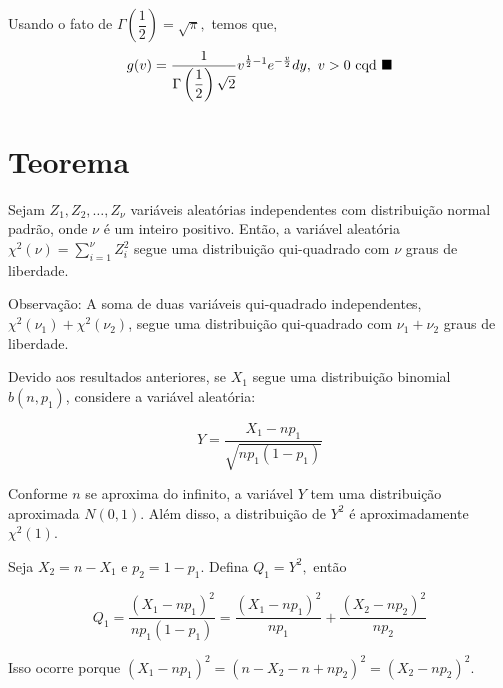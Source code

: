 \documentclass[12pt]{beamer}
\begin{document}
\begin{frame}{}
\begin{block}{}
\justifying
Usando o fato de $\Gamma\left(\dfrac{1}{2}\right)=\sqrt{\pi},$ temos que,
\begin{align*}
   g(v)=\dfrac{1}{\Gamma\left(\dfrac{1}{2}\right)\sqrt{2}}v^{\frac{1}{2}-1}e^{-\frac{v}{2}}dy,~v>0~\text{cqd}~\blacksquare
\end{align*}

\end{block}
\end{frame}

\section{Teorema}
\begin{frame}{}
\begin{Teorema}
\justifying
Sejam $Z_1, Z_2, \ldots, Z_{\nu}$ variáveis aleatórias independentes com distribuição normal padrão, onde $\nu$ é um inteiro positivo. Então, a variável aleatória $\chi^2(\nu) = {\displaystyle \sum_{i=1}^{\nu}} Z_i^2$ segue uma distribuição qui-quadrado com $\nu$ graus de liberdade.
\end{Teorema}
\pause
\begin{block}{Observação:}
\justifying
A soma de duas variáveis qui-quadrado independentes, $\chi^2(\nu_1) + \chi^2(\nu_2)$, segue uma distribuição qui-quadrado com $\nu_1 + \nu_2$ graus de liberdade.
\end{block}
\end{frame}

\begin{frame}{}
\begin{block}{}
\justifying
Devido aos resultados anteriores, se $X_1$ segue uma distribuição binomial $b(n, p_1)$, considere a variável aleatória:

\[
Y = \frac{X_1 - np_1}{\sqrt{np_1(1 - p_1)}}
\]
\end{block}
\pause
\begin{block}{}
\justifying
Conforme $n$ se aproxima do infinito, a variável $Y$ tem uma distribuição aproximada $N(0, 1).$ Além disso, a distribuição de $Y^2$ é aproximadamente $\chi^2(1)$.
\end{block}
\end{frame}

\begin{frame}{}
\begin{block}{}
\justifying
Seja $X_2 = n - X_1$ e $p_2 = 1 - p_1$. Defina $Q_1=Y^{2},$ então

\[
Q_1 = \frac{(X_1 - np_1)^2}{np_1(1 - p_1)} = \frac{(X_1 - np_1)^2}{np_1} + \frac{(X_2 - np_2)^2}{np_2}
\]

Isso ocorre porque $(X_1 - np_1)^2 = (n - X_2 - n + np_2)^2 = (X_2 - np_2)^2$. 
\end{block}
\end{frame}
\end{document}
